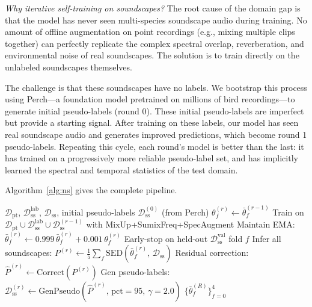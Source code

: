 \documentclass[journal]{IEEEtran}
\begin{document}
\emph{Why iterative self-training on soundscapes?}
The root cause of the domain gap is that the model has never seen multi-species soundscape audio during training.
No amount of offline augmentation on point recordings (e.g., mixing multiple clips together) can perfectly replicate the complex spectral overlap, reverberation, and environmental noise of real soundscapes.
The solution is to train directly on the unlabeled soundscapes themselves.

The challenge is that these soundscapes have no labels.
We bootstrap this process using Perch---a foundation model pretrained on millions of bird recordings---to generate initial pseudo-labels (round 0).
These initial pseudo-labels are imperfect but provide a starting signal.
After training on these labels, our model has seen real soundscape audio and generates improved predictions, which become round 1 pseudo-labels.
Repeating this cycle, each round's model is better than the last: it has trained on a progressively more reliable pseudo-label set, and has implicitly learned the spectral and temporal statistics of the test domain.

Algorithm~\ref{alg:ns} gives the complete pipeline.

\begin{algorithm}[h]
\caption{Multi-Round Noisy Student SED Pipeline}
\label{alg:ns}
\begin{algorithmic}[1]
\REQUIRE $\mathcal{D}_\text{pt}$, $\mathcal{D}_\text{ss}^\text{lab}$, $\mathcal{D}_\text{ss}$, initial pseudo-labels $\mathcal{D}_\text{ss}^{(0)}$ (from Perch)
    \STATE $\theta_f^{(r)} \leftarrow \bar{\theta}_f^{(r-1)}$ \hfill {}
    \STATE Train on $\mathcal{D}_\text{pt} \cup \mathcal{D}_\text{ss}^\text{lab} \cup \mathcal{D}_\text{ss}^{(r-1)}$ with MixUp+SumixFreq+SpecAugment
    \STATE Maintain EMA: $\bar{\theta}_f^{(r)} \leftarrow 0.999\,\bar{\theta}_f^{(r)} + 0.001\,\theta_f^{(r)}$
    \STATE Early-stop on held-out $\mathcal{D}_\text{ss}^\text{val}$ fold $f$
  \ENDFOR
  \STATE Infer all soundscapes: $P^{(r)} \leftarrow \tfrac{1}{5}\sum_f \text{SED}(\bar{\theta}_f^{(r)},\, \mathcal{D}_\text{ss})$
  \STATE Residual correction: $\hat{P}^{(r)} \leftarrow \text{Correct}(P^{(r)})$
  \STATE Gen pseudo-labels: $\mathcal{D}_\text{ss}^{(r)} \leftarrow \text{GenPseudo}(\hat{P}^{(r)},\,\text{pct}=95,\,\gamma=2.0)$
\ENDFOR
\RETURN $\{\bar{\theta}_f^{(R)}\}_{f=0}^{4}$
\end{algorithmic}
\end{algorithm}
\end{document}
